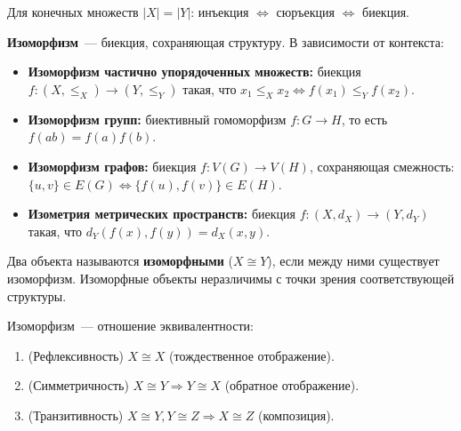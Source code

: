 \documentclass[12pt]{article}
\begin{document}
	\begin{note}
		Для конечных множеств $|X| = |Y|$: инъекция $\Leftrightarrow$ сюръекция $\Leftrightarrow$ биекция.
	\end{note}
	
	\begin{definition}
		\textbf{Изоморфизм}~--- биекция, сохраняющая структуру. В зависимости от контекста:
		\begin{itemize}
			\item \textbf{Изоморфизм частично упорядоченных множеств:} биекция $f: (X, \leqslant_X) \to (Y, \leqslant_Y)$ такая, что $x_1 \leqslant_X x_2 \Leftrightarrow f(x_1) \leqslant_Y f(x_2)$.
			\item \textbf{Изоморфизм групп:} биективный гомоморфизм $f: G \to H$, то есть $f(ab) = f(a)f(b)$.
			\item \textbf{Изоморфизм графов:} биекция $f: V(G) \to V(H)$, сохраняющая смежность: $\{u, v\} \in E(G) \Leftrightarrow \{f(u), f(v)\} \in E(H)$.
			\item \textbf{Изометрия метрических пространств:} биекция $f: (X, d_X) \to (Y, d_Y)$ такая, что $d_Y(f(x), f(y)) = d_X(x, y)$.
		\end{itemize}
	\end{definition}
	
	\begin{note}
		Два объекта называются \textbf{изоморфными} ($X \cong Y$), если между ними существует изоморфизм. Изоморфные объекты неразличимы с точки зрения соответствующей структуры.
	\end{note}
	
	\begin{theorem}
		Изоморфизм~--- отношение эквивалентности:
		\begin{enumerate}
			\item (Рефлексивность) $X \cong X$ (тождественное отображение).
			\item (Симметричность) $X \cong Y \Rightarrow Y \cong X$ (обратное отображение).
			\item (Транзитивность) $X \cong Y, Y \cong Z \Rightarrow X \cong Z$ (композиция).
		\end{enumerate}
	\end{theorem}
	
\end{document}
